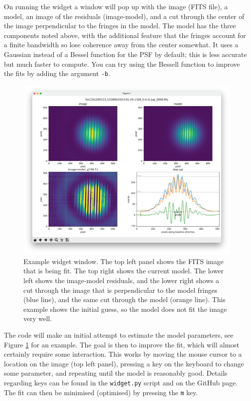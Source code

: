 \documentclass[11pt]{article}
\begin{document}
On running the widget a window will pop up with the image (FITS file), a model, an image of the residuals (image-model), and a cut through the center of the image perpendicular to the fringes in the model. The model has the three components noted above, with the additional feature that the fringes account for a finite bandwidth so lose coherence away from the center somewhat. It uses a Gaussian instead of a Bessel function for the PSF by default; this is less accurate but much faster to compute. You can try using the Bessell function to improve the fits by adding the argument \texttt{-b}.
\begin{figure}[h!]
    \centering
    \includegraphics[width=1\textwidth]{widget.png}
    \caption{Example widget window. The top left panel shows the FITS image that is being fit. The top right shows the current model. The lower left shows the image-model residuals, and the lower right shows a cut through the image that is perpendicular to the model fringes (blue line), and the same cut through the model (orange line). This example shows the initial guess, so the model does not fit the image very well.}
    \label{fig:widget}
\end{figure}

The code will make an initial attempt to estimate the model parameters, see Figure \ref{fig:widget} for an example. The goal is then to improve the fit, which will almost certainly require some interaction. This works by moving the mouse cursor to a location on the image (top left panel), pressing a key on the keyboard to change some parameter, and repeating until the model is reasonably good. Details regarding keys can be found in the \texttt{widget.py} script and on the GitHub page. The fit can then be minimised (optimised) by pressing the \texttt{m} key.
\end{document}

